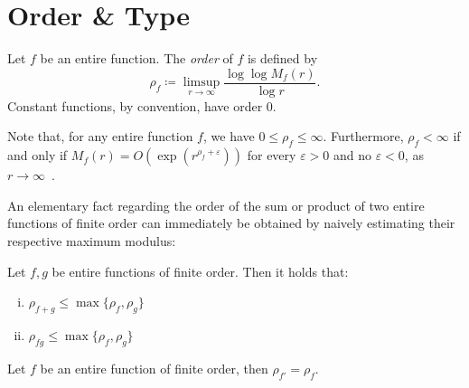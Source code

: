 \section{Order \& Type}
\label{sec:order-type}

\begin{definition} \label{def:order}
    Let $f$ be an entire function. The \emph{order} of $f$ is defined by
    \begin{equation} \label{eq:def-order}
        \rho_f \coloneqq \limsup_{r \to \infty} \frac{\log \log M_f(r)}{\log r}.
    \end{equation}
    Constant functions, by convention, have order 0.
\end{definition}

Note that, for any entire function $f$, we have $0 \leq \rho_f \leq \infty$. Furthermore, $\rho_f < \infty$ if and only if $M_f(r) = O(\exp(r^{\rho_f + \varepsilon}))$ for every $\varepsilon > 0$ and no $\varepsilon < 0$, as $r \to \infty$~\cite{segal-complex-analysis}.

An elementary fact regarding the order of the sum or product of two entire functions of finite order can immediately be obtained by naively estimating their respective maximum modulus:

\begin{proposition} \label{prop:algebraic-properties-order}
    Let $f, g$ be entire functions of finite order. Then it holds that:
    \begin{enumerate}[i.]
        \item $\rho_{f + g} \leq \max \{ \rho_f, \rho_g \}$
        \item $\rho_{f g} \leq \max \{ \rho_f, \rho_g \}$
    \end{enumerate}
\end{proposition}



\begin{proposition} \label{prop:order-derivative}
    Let $f$ be an entire function of finite order, then $\rho_{f'} = \rho_f$.
\end{proposition}

